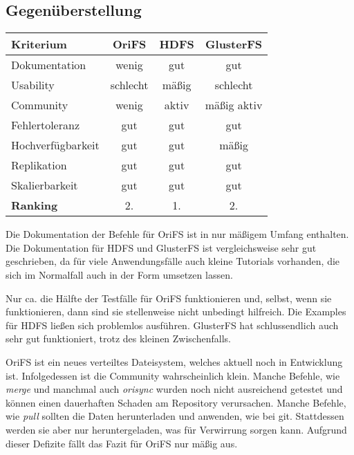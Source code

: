 \subsection{Gegenüberstellung}
\label{subsec:Gegenüberstellung}
\begin{table}[h]
\centering
	\begin{tabular}{|l|c|c|c|}
		\hline
		\textbf{Kriterium}     & \textbf{OriFS} & \textbf{HDFS} & \textbf{GlusterFS} \\ \hline \hline
		Dokumentation    &      wenig         &      gut        &          gut         \\ \hline
		Usability        &      schlecht         &	mäßig	&          schlecht         \\ \hline
		Community        &      wenig         &      aktiv        &		mäßig aktiv		\\ \hline
		Fehlertoleranz  &      gut         &      gut        &          gut         \\ \hline
		Hochverfügbarkeit &      gut         &      gut        &	mäßig	\\ \hline
		Replikation      &      gut         &      gut        &          gut         \\ \hline
		Skalierbarkeit     &      gut         &      gut        &          gut         \\ \hline \hline
		\textbf{Ranking} & 2.               &	1.	&2.\\ \hline
	\end{tabular}
\end{table}

Die Dokumentation der Befehle für OriFS ist in nur mäßigem Umfang enthalten. Die Dokumentation für HDFS und GlusterFS ist vergleichsweise sehr gut geschrieben, da für viele Anwendungsfälle auch kleine Tutorials vorhanden, die sich im Normalfall auch in der Form umsetzen lassen.

Nur ca. die Hälfte der Testfälle für OriFS funktionieren und, selbst, wenn sie funktionieren, dann sind sie stellenweise nicht unbedingt hilfreich. Die Examples für HDFS ließen sich problemlos ausführen. GlusterFS hat schlussendlich auch sehr gut funktioniert, trotz des kleinen Zwischenfalls.

OriFS ist ein neues verteiltes Dateisystem, welches aktuell noch in Entwicklung ist. Infolgedessen ist die Community wahrscheinlich klein. Manche Befehle, wie \textit{merge} und manchmal auch \textit{orisync} wurden noch nicht ausreichend getestet und können einen dauerhaften Schaden am Repository verursachen. Manche Befehle, wie \textit{pull} sollten die Daten herunterladen und anwenden, wie bei git. Stattdessen werden sie aber nur heruntergeladen, was für Verwirrung sorgen kann. Aufgrund dieser Defizite fällt das Fazit für OriFS nur mäßig aus.